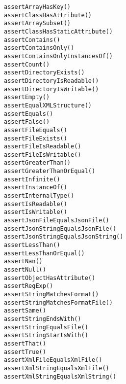 \documentclass[a4paper,10pt,headsepline]{scrartcl}
\begin{document}
\begin{verbatim}
assertArrayHasKey()
assertClassHasAttribute()
assertArraySubset()
assertClassHasStaticAttribute()
assertContains()
assertContainsOnly()
assertContainsOnlyInstancesOf()
assertCount()
assertDirectoryExists()
assertDirectoryIsReadable()
assertDirectoryIsWritable()
assertEmpty()
assertEqualXMLStructure()
assertEquals()
assertFalse()
assertFileEquals()
assertFileExists()
assertFileIsReadable()
assertFileIsWritable()
assertGreaterThan()
assertGreaterThanOrEqual()
assertInfinite()
assertInstanceOf()
assertInternalType()
assertIsReadable()
assertIsWritable()
assertJsonFileEqualsJsonFile()
assertJsonStringEqualsJsonFile()
assertJsonStringEqualsJsonString()
assertLessThan()
assertLessThanOrEqual()
assertNan()
assertNull()
assertObjectHasAttribute()
assertRegExp()
assertStringMatchesFormat()
assertStringMatchesFormatFile()
assertSame()
assertStringEndsWith()
assertStringEqualsFile()
assertStringStartsWith()
assertThat()
assertTrue()
assertXmlFileEqualsXmlFile()
assertXmlStringEqualsXmlFile()
assertXmlStringEqualsXmlString()
\end{verbatim}
\end{document}
